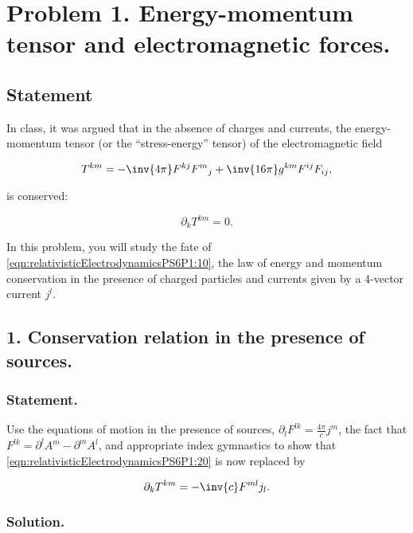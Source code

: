 \section{Problem 1.  Energy-momentum tensor and electromagnetic forces.}
\subsection{Statement}

In class, it was argued that in the absence of charges and currents, the energy-momentum tensor (or the ``stress-energy'' tensor) of the electromagnetic field

\begin{equation}\label{eqn:relativisticElectrodynamicsPS6P1:10}
T^{k m} = -\inv{4\pi} F^{k j} {F^{m}}_j + \inv{16 \pi} g^{k m} F^{i j} F_{i j},
\end{equation}

is conserved:

\begin{equation}\label{eqn:relativisticElectrodynamicsPS6P1:20}
\partial_k T^{k m} = 0.
\end{equation}

In this problem, you will study the fate of \ref{eqn:relativisticElectrodynamicsPS6P1:10}, the law of energy and momentum conservation in the presence of charged particles and currents given by a 4-vector current $j^l$.

\subsection{1. Conservation relation in the presence of sources.}

\subsubsection{Statement.}

Use the equations of motion in the presence of sources, $\partial_l F^{l k} = \frac{4 \pi}{c} j^m$, the fact that $F^{l k} = \partial^l A^m - \partial^m A^l$, and appropriate index gymnastics to show that \ref{eqn:relativisticElectrodynamicsPS6P1:20} is now replaced by 

\begin{equation}\label{eqn:relativisticElectrodynamicsPS6P1:30}
\partial_k T^{k m} = -\inv{c} F^{m l} j_l.
\end{equation}

\subsubsection{Solution.}

